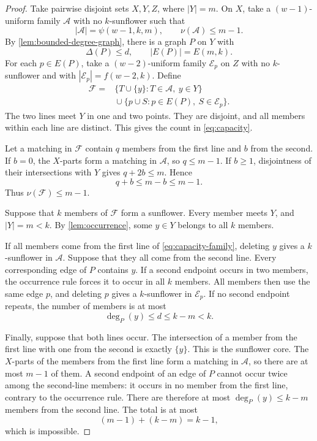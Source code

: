 \documentclass[11pt]{article}
\numberwithin{equation}{section}
\theoremstyle{definition}
\theoremstyle{remark}
\newcommand{\F}{\mathcal F}
\newcommand{\A}{\mathcal A}
\newcommand{\E}{\mathcal E}
\begin{document}
\begin{proof}
Take pairwise disjoint sets $X,Y,Z$, where $|Y|=m$. On $X$, take a
$(w-1)$-uniform family $\A$ with no $k$-sunflower such that
\[
 |\A|=\psi(w-1,k,m),
 \qquad
 \nu(\A)\le m-1.
\]
By \cref{lem:bounded-degree-graph}, there is a graph $P$ on $Y$ with
\[
 \Delta(P)\le d,
 \qquad
 |E(P)|=E(m,k).
\]
For each $p\in E(P)$, take a $(w-2)$-uniform family $\E_p$ on $Z$ with no
$k$-sunflower and with $|\E_p|=f(w-2,k)$. Define
\begin{equation}
\begin{split}
 \F={}&\{T\cup\{y\}:T\in\A,\ y\in Y\}\\
 &{}\cup\{p\cup S:p\in E(P),\ S\in\E_p\}.
\end{split}
\label{eq:capacity-family}
\end{equation}
The two lines meet $Y$ in one and two points. They are disjoint, and all
members within each line are distinct. This gives the count in
\cref{eq:capacity}.

Let a matching in $\F$ contain $q$ members from the first line and $b$ from
the second. If $b=0$, the $X$-parts form a matching in $\A$, so
$q\le m-1$. If $b\ge1$, disjointness of their intersections with $Y$ gives
$q+2b\le m$. Hence
\[
 q+b\le m-b\le m-1.
\]
Thus $\nu(\F)\le m-1$.

Suppose that $k$ members of $\F$ form a sunflower. Every member meets $Y$,
and $|Y|=m<k$. By \cref{lem:occurrence}, some $y\in Y$ belongs to all $k$
members.

If all members come from the first line of \cref{eq:capacity-family}, deleting
$y$ gives a $k$-sunflower in $\A$. Suppose that they all come from the second
line. Every corresponding edge of $P$ contains $y$. If a second endpoint
occurs in two members, the occurrence rule forces it to occur in all $k$
members. All members then use the same edge $p$, and deleting $p$ gives a
$k$-sunflower in $\E_p$. If no second endpoint repeats, the number of members
is at most
\[
 \deg_P(y)\le d\le k-m<k.
\]

Finally, suppose that both lines occur. The intersection of a member from the
first line with one from the second is exactly $\{y\}$. This is the sunflower
core. The $X$-parts of the members from the first line form a matching in
$\A$, so there are at most $m-1$ of them. A second endpoint of an edge of $P$
cannot occur twice among the second-line members: it occurs in no member from
the first line, contrary to the occurrence rule. There are therefore at
most $\deg_P(y)\le k-m$ members from the second line. The total is at most
\[
 (m-1)+(k-m)=k-1,
\]
which is impossible.
\end{proof}
\end{document}
